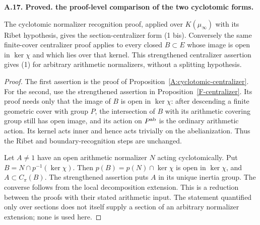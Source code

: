 \documentclass[11pt,oneside]{article}
\makeatletter
\newcounter{statementanchor}
\newenvironment{statement}[3]{%
 \refstepcounter{statementanchor}\def\@currentlabel{#1}%
 \par\addvspace{9pt}\noindent
 \textbf{#1. #2. #3.}\par\nobreak\noindent\ignorespaces
}{\par\addvspace{5pt}}
\makeatother
\begin{document}
\begin{statement}{A.17}{Proved}{the proof-level comparison of the two cyclotomic forms}
\label{st:A.17}
\label{A:normalizer-implications}
The cyclotomic normalizer recognition proof, applied over
$K(\mu_\infty)$ with its Ribet hypothesis, gives the
section-centralizer form (1 bis).  Conversely the same
finite-cover centralizer proof applies to every closed
$B\subset E$ whose image is open in $\ker\chi$ and
which lies over that kernel.  This strengthened
centralizer assertion gives (1) for arbitrary arithmetic
normalizers, without a splitting hypothesis.
\end{statement}
\begin{proof}
The first assertion is the proof of
Proposition~\ref{A:cyclotomic-centralizer}.  For the
second, use the strengthened assertion in
Proposition~\ref{F-centralizer}.  Its proof needs only
that the image of $B$ is open in $\ker\chi$: after
descending a finite geometric cover with group $P$, the
intersection of $B$ with its arithmetic covering group
still has open image, and its action on $P^{\rm ab}$
is the ordinary arithmetic action.  Its kernel acts
inner and hence acts trivially on the abelianization.
Thus the Ribet and boundary-recognition steps are
unchanged.

Let $A\ne1$ have an open arithmetic normalizer $N$
acting cyclotomically.  Put $B=N\cap p^{-1}(\ker\chi)$.
Then $p(B)=p(N)\cap\ker\chi$ is open in $\ker\chi$,
and $A\subset C_\pi(B)$.  The strengthened assertion
puts $A$ in its unique inertia group.  The converse
follows from the local decomposition extension.
This is a reduction between the proofs with their stated
arithmetic input.  The statement quantified only over
sections does not itself supply a section of an arbitrary
normalizer extension; none is used here.
\end{proof}
\end{document}
